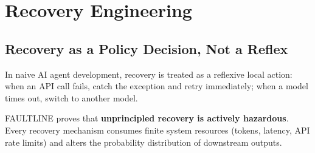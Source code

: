 \section{Recovery Engineering}

\subsection{Recovery as a Policy Decision, Not a Reflex}
In naive AI agent development, recovery is treated as a reflexive local action: when an API call fails, catch the exception and retry immediately; when a model times out, switch to another model.

FAULTLINE proves that \textbf{unprincipled recovery is actively hazardous}. Every recovery mechanism consumes finite system resources (tokens, latency, API rate limits) and alters the probability distribution of downstream outputs.


